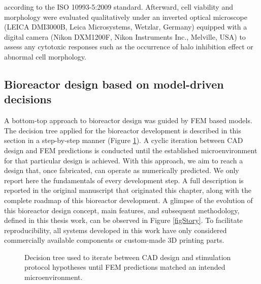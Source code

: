 according to the ISO 10993-5:2009 standard. Afterward, cell viability and morphology were evaluated qualitatively under an inverted optical microscope (LEICA DMI3000B, Leica Microsystems, Wetzlar, Germany) equipped with a digital camera (Nikon DXM1200F, Nikon Instruments Inc., Melville, USA) to assess any cytotoxic responses such as the occurrence of halo inhibition effect or abnormal cell morphology.


\subsection{Bioreactor design based on model-driven decisions}
A bottom-top approach to bioreactor design was guided by \acs{FEM} based models. The decision tree applied for the bioreactor development is described in this section in a step-by-step manner (Figure \ref{figStrategy}). A cyclic iteration between \acs{CAD} design and \acs{FEM} predictions is conducted until the established microenvironment for that particular design is achieved. With this approach, we aim to reach a design that, once fabricated, can operate as numerically predicted. We only report here the fundamentals of every development step. A full description is reported in the original manuscript that originated this chapter, along with the complete roadmap of this bioreactor development. A glimpse of the evolution of this bioreactor design concept, main features, and subsequent methodology, defined in this thesis work, can be observed in Figure \ref{figStory}. To facilitate reproducibility, all systems developed in this work have only considered commercially available components or custom-made \acs{3D} printing parts.  

\begin{figure}
\caption{Decision tree used to iterate between \acs{CAD} design and stimulation protocol hypotheses until \acs{FEM} predictions matched an intended microenvironment.}
\label{figStrategy}
\end{figure}

